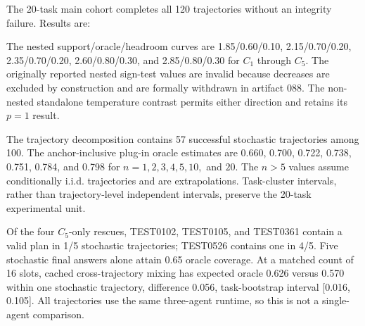 \documentclass{article}
\begin{document}
The 20-task main cohort completes all 120 trajectories without an integrity failure. Results are:

\begin{center}
\end{center}

The nested support/oracle/headroom curves are 1.85/0.60/0.10, 2.15/0.70/0.20, 2.35/0.70/0.20, 2.60/0.80/0.30, and 2.85/0.80/0.30 for \(C_1\) through \(C_5\). The originally reported nested sign-test values are invalid because decreases are excluded by construction and are formally withdrawn in artifact 088. The non-nested standalone temperature contrast permits either direction and retains its \(p=1\) result.

The trajectory decomposition contains 57 successful stochastic trajectories among 100. The anchor-inclusive plug-in oracle estimates are 0.660, 0.700, 0.722, 0.738, 0.751, 0.784, and 0.798 for \(n=1,2,3,4,5,10,\) and \(20\). The \(n>5\) values assume conditionally i.i.d. trajectories and are extrapolations. Task-cluster intervals, rather than trajectory-level independent intervals, preserve the 20-task experimental unit.

Of the four \(C_5\)-only rescues, TEST0102, TEST0105, and TEST0361 contain a valid plan in 1/5 stochastic trajectories; TEST0526 contains one in 4/5. Five stochastic final answers alone attain 0.65 oracle coverage. At a matched count of 16 slots, cached cross-trajectory mixing has expected oracle 0.626 versus 0.570 within one stochastic trajectory, difference 0.056, task-bootstrap interval [0.016, 0.105]. All trajectories use the same three-agent runtime, so this is not a single-agent comparison.
\end{document}
